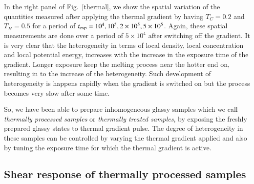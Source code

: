  In the right panel of Fig.~\ref{thermal}, we show the spatial variation of the quantities measured after applying the thermal gradient by having $T_C = 0.2$ and $T_H = 0.5$ for a period of $ t_{\rm exp} = 10^4, 10^5, 2\times10^5, 5\times10^5$. Again, these spatial measurements are done over a period of  $5 \times 10^4$ after switching off the gradient. It is very clear that the heterogeneity in terms of local density, local concentration and local potential energy, increases with the increase in the exposure time of the gradient. Longer exposure keep the melting process near the hotter end on, resulting in to the increase of the heterogeneity. Such development of heterogeneity is happens rapidly when the gradient is switched on but the process becomes very slow after some time.
 
 So, we have been able to prepare inhomogeneous glassy samples which we call {\em thermally processed samples} or {\em thermally treated samples}, by exposing the freshly prepared glassy states to thermal gradient pulse. The degree of heterogeneity in these samples can be controlled by varying the thermal gradient applied and also by tuning the exposure time for which the thermal gradient is active. 
 

\subsection{Shear response of thermally processed samples}

